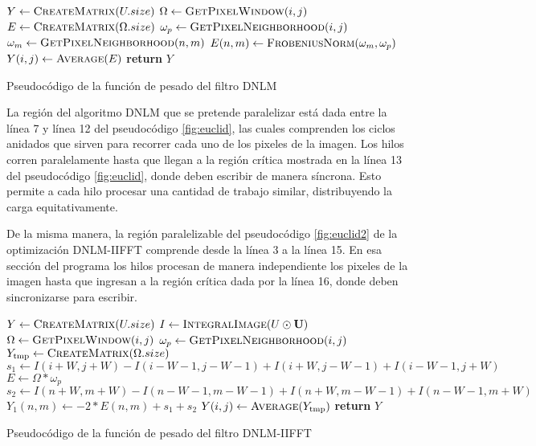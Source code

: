 \begin{algorithm}[htbp]
\begin{algorithmic}[1]
\State $Y\gets \Call{CreateMatrix}{U.size}$
		\State $\Omega\gets \Call{GetPixelWindow}{i,j}$
        \State $E\gets \Call{CreateMatrix}{\Omega.size}$
        \State $\omega_{p}\gets \Call{GetPixelNeighborhood}{i,j}$
        		\State $\omega_{m}\gets \Call{GetPixelNeighborhood}{n,m}$
                \State $E(n,m)\gets \Call{FrobeniusNorm}{\omega_m,\omega_p}$              
        	\EndFor 
        \EndFor 
        \State $Y(i,j)\gets \Call{Average}{E}$
	\EndFor
\EndFor
\State \textbf{return} $Y$
\end{algorithmic}
\caption{Pseudocódigo de la funci\'on de pesado del filtro DNLM\label{fig:euclid}}
\end{algorithm}

La región del algoritmo DNLM que se pretende paralelizar está dada entre la l\'inea 7 y línea 12 del pseudoc\'odigo \ref{fig:euclid}, las cuales comprenden los ciclos anidados que sirven para recorrer cada uno de los pixeles de la imagen. Los hilos corren paralelamente hasta que llegan a la región crítica mostrada en la línea 13 del pseudoc\'odigo \ref{fig:euclid}, donde deben escribir de manera síncrona. Esto permite a cada hilo procesar una cantidad de trabajo similar, distribuyendo la carga equitativamente.

De la misma manera, la regi\'on paralelizable del pseudoc\'odigo \ref{fig:euclid2} de la optimización DNLM-IIFFT comprende desde la línea 3 a la línea 15. En esa secci\'on del programa los hilos procesan de manera independiente los pixeles de la imagen hasta que ingresan a la región crítica dada por la línea 16, donde deben sincronizarse para escribir.


\begin{algorithm}[htbp]
\begin{algorithmic}[1]
\State $Y\gets \Call{CreateMatrix}{U.size}$
\State $I\gets \Call{IntegralImage}{U\odot \mat{U}}$
		\State $\Omega\gets \Call{GetPixelWindow}{i,j}$
        \State $\omega_{p}\gets \Call{GetPixelNeighborhood}{i,j}$
        \State $Y_{\text{tmp}}\gets \Call{CreateMatrix}{\Omega.size}$
        \State $s_{1} \gets I(i+W,j+W)-I(i-W-1,j-W-1)+I(i+W,j-W-1)+I(i-W-1,j+W)$
        \State $E\gets \Omega * \omega_{p}$ 
        		\State $s_{2} \gets I(n+W,m+W)-I(n-W-1,m-W-1)+I(n+W,m-W-1)+I(n-W-1,m+W)$
        		\State $Y_{1}(n,m)\gets -2*E(n,m) + s_{1} + s_{2}$
        	\EndFor 
        \EndFor 
        \State $Y(i,j)\gets \Call{Average}{Y_{\text{tmp}}}$
	\EndFor
\EndFor
\State \textbf{return} $Y$
\end{algorithmic}
\caption{Pseudocódigo de la funci\'on de pesado del filtro DNLM-IIFFT\label{fig:euclid2}}
\end{algorithm}

